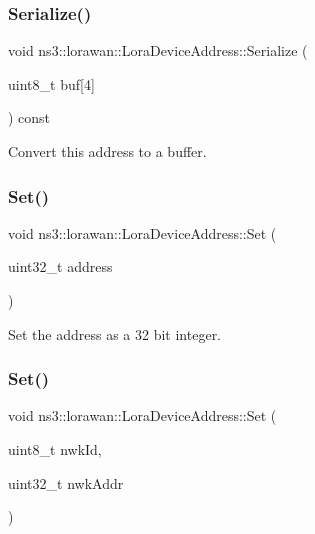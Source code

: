 \subsubsection{\texorpdfstring{Serialize()}{Serialize()}}
{\footnotesize\ttfamily void ns3\+::lorawan\+::\+Lora\+Device\+Address\+::\+Serialize (\begin{DoxyParamCaption}\item[{uint8\+\_\+t}]{buf\mbox{[}4\mbox{]} }\end{DoxyParamCaption}) const}

Convert this address to a buffer. \mbox{\label{classns3_1_1lorawan_1_1LoraDeviceAddress_a657bbdd10455e832e8202e5bb09ab579}} 
\subsubsection{\texorpdfstring{Set()}{Set()}\hspace{0.1cm}{\footnotesize\ttfamily [1/2]}}
{\footnotesize\ttfamily void ns3\+::lorawan\+::\+Lora\+Device\+Address\+::\+Set (\begin{DoxyParamCaption}\item[{uint32\+\_\+t}]{address }\end{DoxyParamCaption})}

Set the address as a 32 bit integer. \mbox{\label{classns3_1_1lorawan_1_1LoraDeviceAddress_afaea2e488470d29fa3395412b11e7828}} 
\subsubsection{\texorpdfstring{Set()}{Set()}\hspace{0.1cm}{\footnotesize\ttfamily [2/2]}}
{\footnotesize\ttfamily void ns3\+::lorawan\+::\+Lora\+Device\+Address\+::\+Set (\begin{DoxyParamCaption}\item[{uint8\+\_\+t}]{nwk\+Id,  }\item[{uint32\+\_\+t}]{nwk\+Addr }\end{DoxyParamCaption})}

